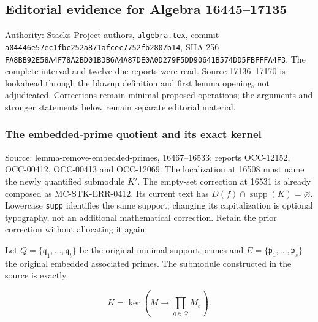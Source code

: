 \subsection{Editorial evidence for Algebra 16445--17135}\label{algebra-proof-006-editorial-evidence-for-algebra-1644517135}

Authority: Stacks Project authors, \texttt{algebra.tex}, commit \texttt{a044\allowbreak{}46e5\allowbreak{}7ec1\allowbreak{}fbc2\allowbreak{}52a8\allowbreak{}71af\allowbreak{}cec7\allowbreak{}752f\allowbreak{}b280\allowbreak{}7b14}, SHA-256 \texttt{FA8B\allowbreak{}B92E\allowbreak{}58A4\allowbreak{}F78A\allowbreak{}2BD0\allowbreak{}1B3B\allowbreak{}6A4A\allowbreak{}87DE\allowbreak{}0A0D\allowbreak{}279F\allowbreak{}5DD9\allowbreak{}0641\allowbreak{}B574\allowbreak{}DD5F\allowbreak{}BFFF\allowbreak{}A4F3}. The complete interval and twelve due reports were read. Source 17136--17170 is lookahead through the blowup definition and first lemma opening, not adjudicated. Corrections remain minimal proposed operations; the arguments and stronger statements below remain separate editorial material.

\subsubsection{The embedded-prime quotient and its exact kernel}\label{algebra-proof-006-the-embedded-prime-quotient-and-its-exact-kernel}

Source: lemma-\AlgebraIdentifierBreak{}remove-\AlgebraIdentifierBreak{}embedded-\AlgebraIdentifierBreak{}primes, 16467--16533; reports OCC-12152, OCC-00412, OCC-00413 and OCC-12069. The localization at 16508 must name the newly quantified submodule \(K'\). The empty-set correction at 16531 is already composed as MC-\AlgebraIdentifierBreak{}STK-\AlgebraIdentifierBreak{}ERR-\AlgebraIdentifierBreak{}0412. Its current text has \(D(f)\cap\operatorname{supp}(K)=\varnothing\). Lowercase \texttt{supp} identifies the same support; changing its capitalization is optional typography, not an additional mathematical correction. Retain the prior correction without allocating it again.

Let \(Q=\{\mathfrak q_1,\ldots,\mathfrak q_t\}\) be the original minimal support primes and \(E=\{\mathfrak p_1,\ldots,\mathfrak p_s\}\) the original embedded associated primes. The submodule constructed in the source is exactly

\[
K=\ker\left(M\longrightarrow\prod_{\mathfrak q\in Q}M_{\mathfrak q}\right).
\]

